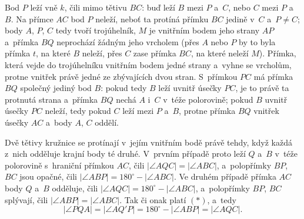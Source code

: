 {    Bod $P$ leží vně $k$, čili mimo tětivu $BC$: buď leží $B$ mezi $P$ a~$C$, nebo $C$ mezi $P$ a~$B$. Na přímce $AC$ bod $P$ neleží, neboť ta protíná přímku $BC$ jedině v~$C$ a~$P \neq C$; body $A$, $P$, $C$ tedy tvoří trojúhelník, $M$ je vnitřním bodem jeho strany $AP$ a~přímka $BQ$ neprochází žádným jeho vrcholem (přes $A$ nebo $P$ by to byla přímka $t$, na které $B$ neleží, přes $C$ zase přímka $BC$, na které neleží $M$). Přímka, která vejde do trojúhelníku vnitřním bodem jedné strany a~vyhne se vrcholům, protne vnitřek právě jedné ze zbývajících dvou stran. S~přímkou $PC$ má přímka $BQ$ společný jediný bod $B$: pokud tedy $B$ leží uvnitř úsečky $PC$, je to právě ta protnutá strana a~přímka $BQ$ nechá $A$ i~$C$ v~téže polorovině; pokud $B$ uvnitř úsečky $PC$ neleží, tedy pokud $C$ leží mezi $P$ a~$B$, protne přímka $BQ$ vnitřek úsečky $AC$ a~body $A$, $C$ oddělí.

    Dvě tětivy kružnice se protínají v~jejím vnitřním bodě právě tehdy, když každá z~nich odděluje krajní body té druhé. V~prvním případě proto leží $Q$ a~$B$ v~téže polorovině s~hraniční přímkou $AC$, čili $|\angle AQC| = |\angle ABC|$, a~polopřímky $BP$, $BC$ jsou opačné, čili $|\angle ABP| = 180^\circ - |\angle ABC|$. Ve druhém případě přímka $AC$ body $Q$ a~$B$ odděluje, čili $|\angle AQC| = 180^\circ - |\angle ABC|$, a~polopřímky $BP$, $BC$ splývají, čili $|\angle ABP| = |\angle ABC|$. Tak či onak platí $(*)$, a~tedy
    $$
    |\angle PQA| = |\angle AQ'P| = 180^\circ - |\angle ABP| = |\angle AQC|.
    $$
}

